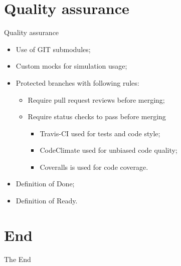 \documentclass{beamer}
\begin{document}
\section{Quality assurance}
\begin{frame}{Quality assurance}
	\begin{itemize}
		\item Use of GIT submodules;
		\item Custom mocks for simulation usage;
		\item Protected branches with following rules:
			\begin{itemize}
				\item Require pull request reviews before merging;
				\item Require status checks to pass before merging
				\begin{itemize}
					\item Travis-CI used for tests and code style;
					\item CodeClimate used for unbiased code quality;
					\item Coveralls is used for code coverage.
				\end{itemize}
			\end{itemize}
		\item Definition of Done;
		\item Definition of Ready.
	\end{itemize}
\end{frame}

\section{End}
\begin{frame}
\Huge{\centerline{The End}}
\end{frame}
\end{document}
